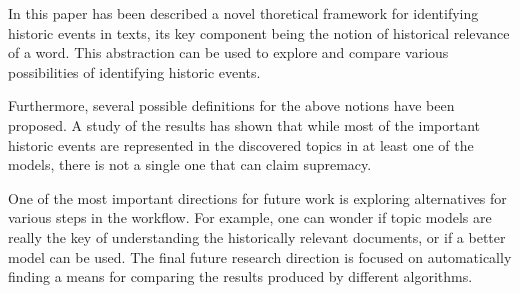 
In this paper has been described a novel thoretical framework for identifying historic events in texts, its key component being the notion of historical relevance of a word. This abstraction can be used to explore and compare various possibilities of identifying historic events.

Furthermore, several possible definitions for the above notions have been proposed. A study of the results has shown that while most of the important historic events are represented in the discovered topics in at least one of the models, there is not a single one that can claim supremacy.

One of the most important directions for future work is exploring alternatives for various steps in the workflow. For example, one can wonder if topic models are really the key of understanding the historically relevant documents, or if a better model can be used. The final future research direction is focused on automatically finding a means for comparing the results produced by different algorithms. 
